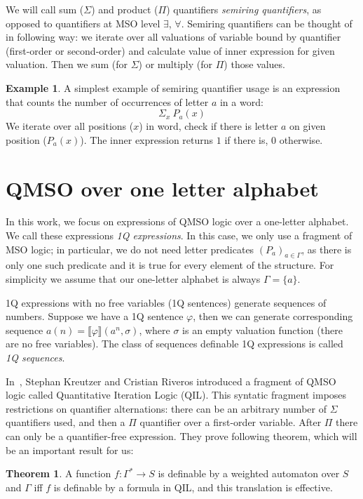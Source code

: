 \documentclass[en]{pracamgr}
\theoremstyle{definition}
\newtheorem{theorem}{Theorem}[section]
\newtheorem{example}{Example}[section]
\begin{document}
We will call sum ($\Sigma$) and product ($\Pi$) quantifiers \emph{semiring quantifiers}, as opposed to quantifiers at MSO level $\exists$, $\forall$. Semiring quantifiers can be thought of in following way: we iterate over all valuations of variable bound by quantifier (first-order or second-order) and calculate value of inner expression for given valuation. Then we sum (for $\Sigma$) or multiply (for $\Pi$) those values.

\begin{example}
    A simplest example of semiring quantifier usage is an expression that counts the number of occurrences of letter $a$ in a word:
    $$\Sigma_x \ P_a(x)$$
    We iterate over all positions ($x$) in word, check if there is letter $a$ on given position ($P_a(x)$). The inner expression returns $1$ if there is, $0$ otherwise. 
\end{example}

\section{QMSO over one letter alphabet}

In this work, we focus on expressions of QMSO logic over a one-letter alphabet. We call these expressions \emph{1Q expressions}. In this case, we only use a fragment of MSO logic; in particular, we do not need letter predicates $(P_a)_{a \in \Gamma}$, as there is only one such predicate and it is true for every element of the structure. For simplicity we assume that our one-letter alphabet is always $\Gamma = \{a\}$.

1Q expressions with no free variables (1Q sentences) generate sequences of numbers. Suppose we have a 1Q sentence $\varphi$, then we can generate corresponding sequence $a(n) = \llbracket \varphi \rrbracket (a^n, \sigma)$, where $\sigma$ is an empty valuation function (there are no free variables). The class of sequences definable 1Q expressions is called \emph{1Q sequences}.

In~\cite[Section IV]{KreutzerR13}, Stephan Kreutzer and Cristian Riveros introduced a fragment of QMSO logic called Quantitative Iteration Logic (QIL). This syntatic fragment imposes restrictions on quantifier alternations: there can be an arbitrary number of $\Sigma$ quantifiers used, and then a $\Pi$ quantifier over a first-order variable. After $\Pi$ there can only be a quantifier-free expression. They prove following theorem, which will be an important result for us:

\begin{theorem}
\label{QILWL}
    A function $f: \Gamma^* \rightarrow S$ is definable by a weighted automaton over $S$ and $\Gamma$ iff $f$ is definable by a formula in QIL, and this translation is effective.
\end{theorem}
\end{document}
